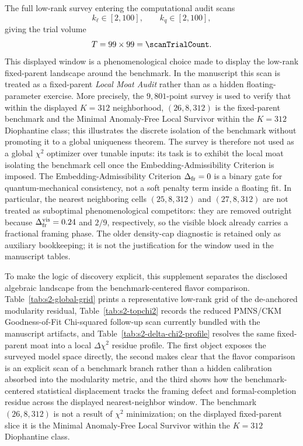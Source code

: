 \documentclass[11pt]{article}
\begin{document}
The full low-rank survey entering the computational audit scans
\begin{equation}
 k_{\ell}\in[2,100],
 \qquad
 k_q\in[2,100],
\end{equation}
giving the trial volume
\begin{equation}
 T = 99\times 99 = \scanTrialCount.
\end{equation}
This displayed window is a phenomenological choice made to display the low-rank fixed-parent landscape around the benchmark. In the manuscript this scan is treated as a fixed-parent \emph{Local Moat Audit} rather than as a hidden floating-parameter exercise. More precisely, the $9{,}801$-point survey is used to verify that within the displayed $K=312$ neighborhood, $(26,8,312)$ is the fixed-parent benchmark and the Minimal Anomaly-Free Local Survivor within the $K=312$ Diophantine class; this illustrates the discrete isolation of the benchmark without promoting it to a global uniqueness theorem. The survey is therefore not used as a global $\chi^2$ optimizer over tunable inputs: its task is to exhibit the local moat isolating the benchmark cell once the Embedding-Admissibility Criterion is imposed. The Embedding-Admissibility Criterion $\Delta_{\rm fr}=0$ is a binary gate for quantum-mechanical consistency, not a soft penalty term inside a floating fit. In particular, the nearest neighboring cells $(25,8,312)$ and $(27,8,312)$ are not treated as suboptimal phenomenological competitors: they are removed outright because $\Delta_{\rm fr}^{\rm vis}=0.24$ and $2/9$, respectively, so the visible block already carries a fractional framing phase. The older density-cap diagnostic is retained only as auxiliary bookkeeping; it is not the justification for the window used in the manuscript tables.

To make the logic of discovery explicit, this supplement separates the disclosed algebraic landscape from the benchmark-centered flavor comparison. Table~\ref{tab:s2-global-grid} prints a representative low-rank grid of the de-anchored modularity residual, Table~\ref{tab:s2-topchi2} records the reduced PMNS/CKM Goodness-of-Fit Chi-squared follow-up scan currently bundled with the manuscript artifacts, and Table~\ref{tab:s2-delta-chi2-profile} resolves the same fixed-parent moat into a local $\Delta\chi^2$ residue profile. The first object exposes the surveyed model space directly, the second makes clear that the flavor comparison is an explicit scan of a benchmark branch rather than a hidden calibration absorbed into the modularity metric, and the third shows how the benchmark-centered statistical displacement tracks the framing defect and formal-completion residue across the displayed nearest-neighbor window. The benchmark $(26,8,312)$ is not a result of $\chi^2$ minimization; on the displayed fixed-parent slice it is the Minimal Anomaly-Free Local Survivor within the $K=312$ Diophantine class.
\end{document}
